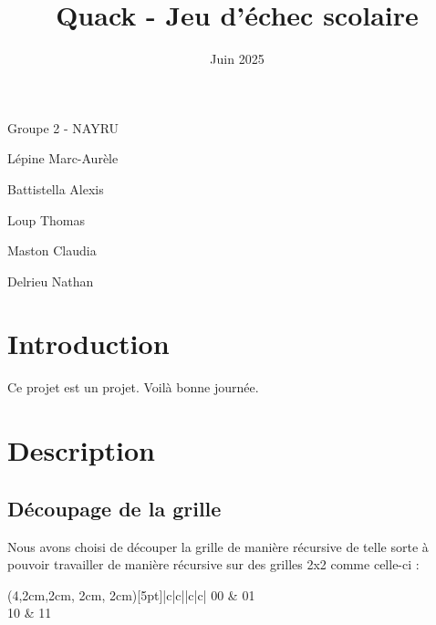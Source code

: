 \documentclass[12pt]{article}
\title{\Huge\textbf{Quack - Jeu d'échec scolaire}}
\date{Juin 2025}
\begin{document}
\maketitle


\renewcommand{\headrulewidth}{0mm} %
\renewcommand{\footrulewidth}{0.1mm} %


\centerline{Groupe 2 - NAYRU}
\vspace{\fill}
Lépine Marc-Aurèle \par
Battistella Alexis \par
Loup Thomas \par
Maston Claudia \par
Delrieu Nathan



\newpage

\renewcommand\contentsname{\centering Table des matières}
\renewcommand\footnoterule{}

\tableofcontents

\newpage

\section{Introduction}
    Ce projet est un projet. Voilà bonne journée.
  
\section {Description}
    \subsection{Découpage de la grille}
    Nous avons choisi de découper la grille de manière récursive de telle sorte à pouvoir travailler de manière récursive sur des grilles 2x2 comme celle-ci :

    \label{sec:grid-2x2}
    \begin{center}
        \begin{TAB}(4,2cm,2cm, 2cm, 2cm)[5pt]{|c|c|}{|c|c|}%
            00 & 01 \\
            10 & 11 \\
        \end{TAB}
    \end{center}
\end{document}
